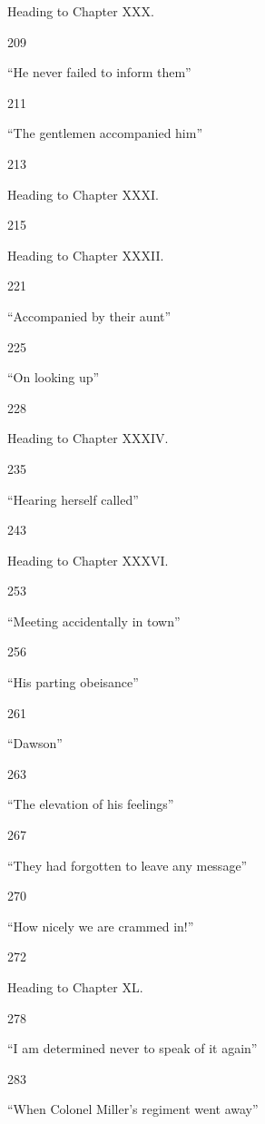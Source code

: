\documentclass[10pt]{book}
\begin{document}
      Heading to Chapter XXX.
     

       209
      

      “He never failed to inform them”
     

       211
      

      “The gentlemen accompanied him”
     

       213
      

      Heading to Chapter XXXI.
     

       215
      

      Heading to Chapter XXXII.
     

       221
      

      “Accompanied by their aunt”
     

       225
      

      “On looking up”
     

       228
      

      Heading to Chapter XXXIV.
     

       235
      

      “Hearing herself called”
     

       243
      

      Heading to Chapter XXXVI.
     

       253
      

      “Meeting accidentally in town”
     

       256
      

      “His parting obeisance”
     

       261
      

      “Dawson”
     

       263
      

      “The elevation of his feelings”
     

       267
      

      “They had forgotten to leave any message”
     

       270
      

      “How nicely we are crammed in!”
     

       272
      

      Heading to Chapter XL.
     

       278
      

      “I am determined never to speak of it again”
     

       283
      

      “When Colonel Miller’s regiment went away”
     
\end{document}
